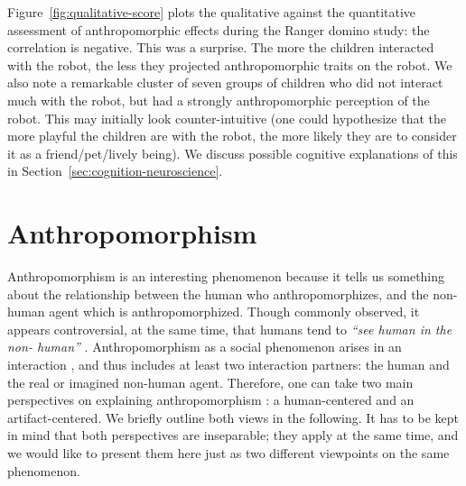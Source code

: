 \documentclass{frontiersSCNS} %
\begin{document}

Figure~\ref{fig:qualitative-score} plots the qualitative against the quantitative assessment of
anthropomorphic effects during the Ranger domino study: the correlation is
negative. This was a surprise. The more the children interacted with the robot, the less they
projected anthropomorphic traits on the robot. We also note a remarkable cluster
of seven groups of children who did not interact much with the robot, but had a
strongly anthropomorphic perception of the robot. This may initially look
counter-intuitive (one could hypothesize that the more playful the children are
with the robot, the more likely they are to consider it as a friend/pet/lively
being). We discuss possible cognitive explanations of this in Section~\ref{sec:cognition-neuroscience}.





%
%
%
%
%
%
%
%
%

\section{Anthropomorphism}
\label{sec:anthropomorphism}

Anthropomorphism is an interesting phenomenon because it tells us something about 
the relationship between the human who anthropomorphizes, and the non-human agent 
which is anthropomorphized. Though commonly observed, it appears controversial, at 
the same time, that humans tend to \textit{``see human in the non-
human''} \citep{epley_seeing_2007}. 
Anthropomorphism as a social phenomenon arises in an interaction 
\citep{persson_anthropomorphism_2000}, and thus includes at least two interaction 
partners: the human and the real or imagined non-human agent. Therefore, one can 
take two main perspectives on explaining anthropomorphism \citep{lee_human_2005}: a human-centered and an artifact-centered. We briefly outline both views in the following. 
It has to be kept in mind that both perspectives are inseparable; they apply at the 
same time, and we would like to present them here just as two different viewpoints 
on the same phenomenon.
\end{document}
